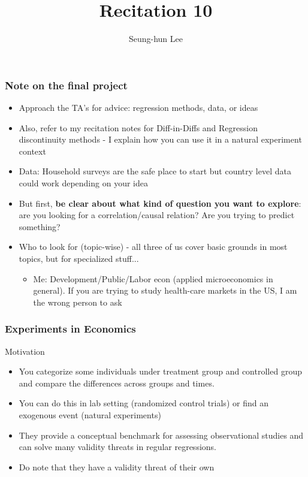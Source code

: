 \documentclass[compress]{beamer}
\title[Recitation 10]{Recitation 10} %
\author[Seung-hun Lee]{Seung-hun Lee}
\institute[Columbia University]{Columbia University}
\date[]{}
\begin{document}
\begin{frame}
\titlepage
\end{frame}

\begin{frame}
\frametitle{Note on the final project}
\begin{itemize}
\item Approach the TA's for advice: regression methods, data, or ideas
\item Also, refer to my recitation notes for Diff-in-Diffs and Regression discontinuity methods - I explain how you can use it in a natural experiment context
\item Data: Household surveys are the safe place to start but country level data could work depending on your idea
\item But first, \textbf{be clear about what kind of question you want to explore}: are you looking for a correlation/causal relation? Are you trying to predict something?
\item Who to look for (topic-wise) - all three of us cover basic grounds in most topics, but for specialized stuff...
\begin{itemize}
\item Me: Development/Public/Labor econ (applied microeconomics in general). If you are trying to study health-care markets in the US, I am the wrong person to ask
\end{itemize}
\end{itemize}
\end{frame}


\begin{frame}
\frametitle{Experiments in Economics}
Motivation
\begin{itemize}
\item You categorize some individuals under treatment group and controlled group and compare the differences across groups and times. 
\item You can do this in lab setting (randomized control trials) or find an exogenous event (natural experiments)
\item They provide a conceptual benchmark for assessing observational studies and can solve many validity threats in regular regressions.
\item Do note that they have a validity threat of their own
\end{itemize}
\end{frame}
\end{document}
